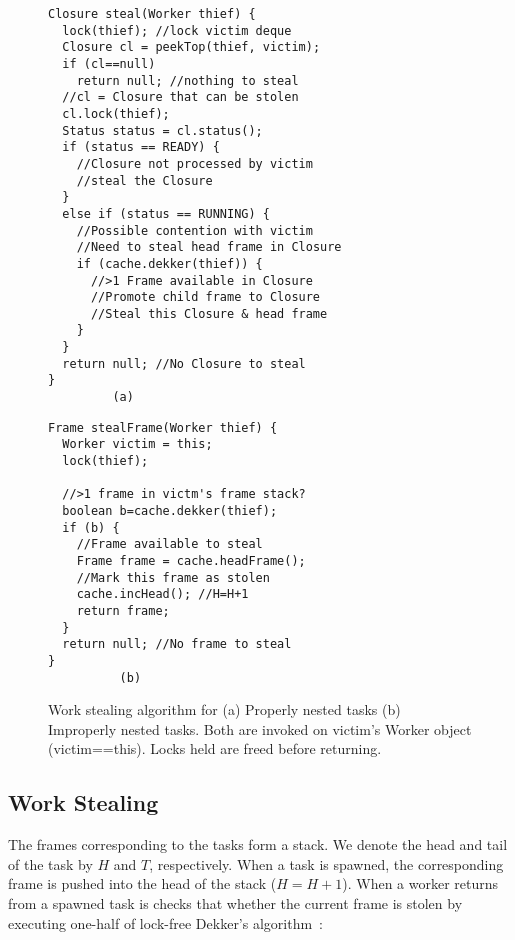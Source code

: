 \begin{figure*}
\begin{minipage}{0.5\textwidth}
\begin{verbatim}
Closure steal(Worker thief) {
  lock(thief); //lock victim deque
  Closure cl = peekTop(thief, victim);
  if (cl==null) 
    return null; //nothing to steal
  //cl = Closure that can be stolen
  cl.lock(thief);
  Status status = cl.status();
  if (status == READY) {
    //Closure not processed by victim
    //steal the Closure
  }
  else if (status == RUNNING) {
    //Possible contention with victim
    //Need to steal head frame in Closure
    if (cache.dekker(thief)) {
      //>1 Frame available in Closure
      //Promote child frame to Closure 
      //Steal this Closure & head frame
    } 
  }
  return null; //No Closure to steal
}
         (a)
\end{verbatim}
\end{minipage}%
\begin{minipage}{0.5\textwidth}
\begin{verbatim}
Frame stealFrame(Worker thief) {
  Worker victim = this;
  lock(thief);

  //>1 frame in victm's frame stack?
  boolean b=cache.dekker(thief);
  if (b) {
    //Frame available to steal
    Frame frame = cache.headFrame();
    //Mark this frame as stolen
    cache.incHead(); //H=H+1
    return frame;
  }
  return null; //No frame to steal
}
          (b) 
\end{verbatim}
\end{minipage}
\caption{Work stealing algorithm for (a) Properly nested tasks (b)
  Improperly nested tasks. Both are invoked on victim's
  Worker object (victim==this). Locks held are freed before returning.}%
\label{fig:stealing-alg}
\end{figure*}



\subsection{Work Stealing}



The frames corresponding to the tasks form a stack. We denote the head
and tail of the task by $H$ and $T$, respectively. When a task is
spawned, the corresponding frame is pushed into the head of the stack
($H=H+1$). When a worker returns from a spawned task is checks that
whether the current frame is stolen by executing one-half of lock-free
Dekker's algorithm~\cite{dekker}:

